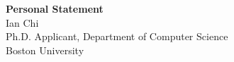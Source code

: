 \documentclass[11pt]{article}
\begin{document}
\begin{center}
    {\Large \textbf{Personal Statement}}\\[4pt]
    {\large Ian Chi}\\[2pt]
    Ph.D. Applicant, Department of Computer Science\\
    Boston University
\end{center}

\vspace{1em}

\end{document}
